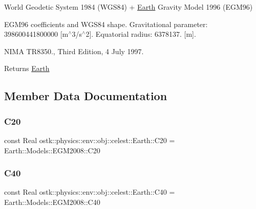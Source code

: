 World Geodetic System 1984 (W\+G\+S84) + \hyperlink{classostk_1_1physics_1_1env_1_1obj_1_1celest_1_1_earth}{Earth} Gravity Model 1996 (E\+G\+M96) 

E\+G\+M96 coefficients and W\+G\+S84 shape. Gravitational parameter\+: 398600441800000 \mbox{[}m$^\wedge$3/s$^\wedge$2\mbox{]}. Equatorial radius\+: 6378137. \mbox{[}m\mbox{]}.

N\+I\+MA T\+R8350., Third Edition, 4 July 1997.

\begin{DoxyReturn}{Returns}
\hyperlink{classostk_1_1physics_1_1env_1_1obj_1_1celest_1_1_earth}{Earth} 
\end{DoxyReturn}


\subsection{Member Data Documentation}
\mbox{\label{classostk_1_1physics_1_1env_1_1obj_1_1celest_1_1_earth_a51d8f851ef1f2c199dbf7707d9843eb4}} 
\subsubsection{\texorpdfstring{C20}{C20}}
{\footnotesize\ttfamily const Real ostk\+::physics\+::env\+::obj\+::celest\+::\+Earth\+::\+C20 = Earth\+::\+Models\+::\+E\+G\+M2008\+::\+C20\hspace{0.3cm}{\ttfamily [static]}}

\mbox{\label{classostk_1_1physics_1_1env_1_1obj_1_1celest_1_1_earth_a0b6e3b6beaa94ea1ed611395e824ce9d}} 
\subsubsection{\texorpdfstring{C40}{C40}}
{\footnotesize\ttfamily const Real ostk\+::physics\+::env\+::obj\+::celest\+::\+Earth\+::\+C40 = Earth\+::\+Models\+::\+E\+G\+M2008\+::\+C40\hspace{0.3cm}{\ttfamily [static]}}

